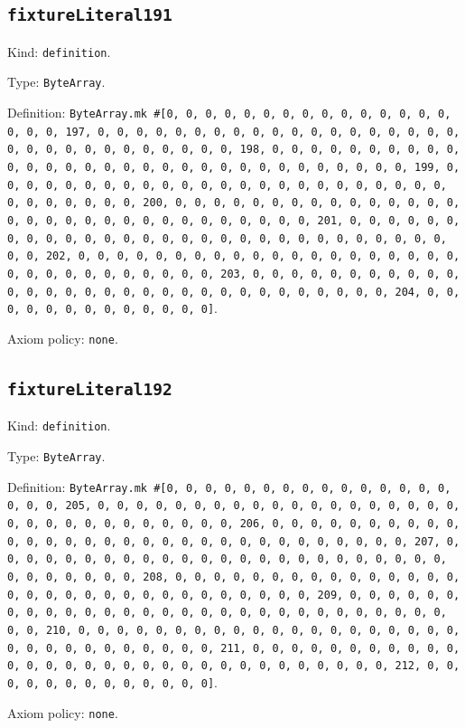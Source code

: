 \documentclass[11pt]{article}
\begin{document}
\subsection*{\texttt{fixtureLiteral191}}
\noindent Kind: \texttt{definition}.\par
\noindent Type: \texttt{ByteArray}.\par
\noindent Definition: \texttt{ByteArray.mk \#[0, 0, 0, 0, 0, 0, 0, 0, 0, 0, 0, 0, 0, 0, 0, 0, 0, 0, 197, 0, 0, 0, 0, 0, 0, 0, 0, 0, 0, 0, 0, 0, 0, 0, 0, 0, 0, 0, 0, 0, 0, 0, 0, 0, 0, 0, 0, 0, 0, 0, 198, 0, 0, 0, 0, 0, 0, 0, 0, 0, 0, 0, 0, 0, 0, 0, 0, 0, 0, 0, 0, 0, 0, 0, 0, 0, 0, 0, 0, 0, 0, 0, 199, 0, 0, 0, 0, 0, 0, 0, 0, 0, 0, 0, 0, 0, 0, 0, 0, 0, 0, 0, 0, 0, 0, 0, 0, 0, 0, 0, 0, 0, 0, 0, 200, 0, 0, 0, 0, 0, 0, 0, 0, 0, 0, 0, 0, 0, 0, 0, 0, 0, 0, 0, 0, 0, 0, 0, 0, 0, 0, 0, 0, 0, 0, 0, 201, 0, 0, 0, 0, 0, 0, 0, 0, 0, 0, 0, 0, 0, 0, 0, 0, 0, 0, 0, 0, 0, 0, 0, 0, 0, 0, 0, 0, 0, 0, 0, 202, 0, 0, 0, 0, 0, 0, 0, 0, 0, 0, 0, 0, 0, 0, 0, 0, 0, 0, 0, 0, 0, 0, 0, 0, 0, 0, 0, 0, 0, 0, 0, 203, 0, 0, 0, 0, 0, 0, 0, 0, 0, 0, 0, 0, 0, 0, 0, 0, 0, 0, 0, 0, 0, 0, 0, 0, 0, 0, 0, 0, 0, 0, 0, 204, 0, 0, 0, 0, 0, 0, 0, 0, 0, 0, 0, 0, 0]}.\par
\noindent Axiom policy: \texttt{none}.\par
\subsection*{\texttt{fixtureLiteral192}}
\noindent Kind: \texttt{definition}.\par
\noindent Type: \texttt{ByteArray}.\par
\noindent Definition: \texttt{ByteArray.mk \#[0, 0, 0, 0, 0, 0, 0, 0, 0, 0, 0, 0, 0, 0, 0, 0, 0, 0, 205, 0, 0, 0, 0, 0, 0, 0, 0, 0, 0, 0, 0, 0, 0, 0, 0, 0, 0, 0, 0, 0, 0, 0, 0, 0, 0, 0, 0, 0, 0, 0, 206, 0, 0, 0, 0, 0, 0, 0, 0, 0, 0, 0, 0, 0, 0, 0, 0, 0, 0, 0, 0, 0, 0, 0, 0, 0, 0, 0, 0, 0, 0, 0, 207, 0, 0, 0, 0, 0, 0, 0, 0, 0, 0, 0, 0, 0, 0, 0, 0, 0, 0, 0, 0, 0, 0, 0, 0, 0, 0, 0, 0, 0, 0, 0, 208, 0, 0, 0, 0, 0, 0, 0, 0, 0, 0, 0, 0, 0, 0, 0, 0, 0, 0, 0, 0, 0, 0, 0, 0, 0, 0, 0, 0, 0, 0, 0, 209, 0, 0, 0, 0, 0, 0, 0, 0, 0, 0, 0, 0, 0, 0, 0, 0, 0, 0, 0, 0, 0, 0, 0, 0, 0, 0, 0, 0, 0, 0, 0, 210, 0, 0, 0, 0, 0, 0, 0, 0, 0, 0, 0, 0, 0, 0, 0, 0, 0, 0, 0, 0, 0, 0, 0, 0, 0, 0, 0, 0, 0, 0, 0, 211, 0, 0, 0, 0, 0, 0, 0, 0, 0, 0, 0, 0, 0, 0, 0, 0, 0, 0, 0, 0, 0, 0, 0, 0, 0, 0, 0, 0, 0, 0, 0, 212, 0, 0, 0, 0, 0, 0, 0, 0, 0, 0, 0, 0, 0]}.\par
\noindent Axiom policy: \texttt{none}.\par
\end{document}
